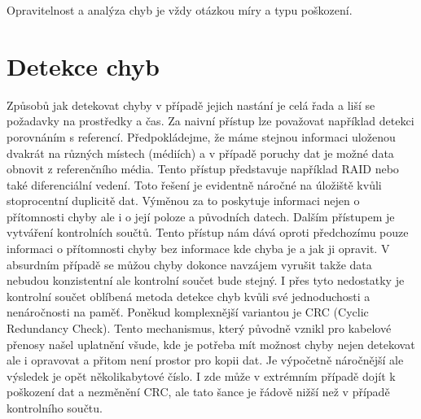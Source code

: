 Opravitelnost a analýza chyb je vždy otázkou míry a typu poškození.

\section{Detekce chyb}
\label{sec:errordetection}
Způsobů jak detekovat chyby v případě jejich nastání je celá řada a liší se požadavky na prostředky a čas. Za naivní přístup lze považovat například detekci porovnáním s referencí. Předpokládejme, že máme stejnou informaci uloženou dvakrát na různých místech (médiích) a v případě poruchy dat je možné data obnovit z referenčního média. Tento přístup představuje například RAID nebo také diferenciální vedení. Toto řešení je evidentně náročné na úložiště kvůli stoprocentní duplicitě dat. Výměnou za to poskytuje informaci nejen o přítomnosti chyby ale i o její poloze a původních datech. Dalším přístupem je vytváření kontrolních součtů. Tento přístup nám dává oproti předchozímu pouze informaci o přítomnosti chyby bez informace kde chyba je a jak ji opravit. V absurdním případě se můžou chyby dokonce navzájem vyrušit takže data nebudou konzistentní ale kontrolní součet bude stejný. I přes tyto nedostatky je kontrolní součet oblíbená metoda detekce chyb kvůli své jednoduchosti a nenáročnosti na paměť. Poněkud komplexnější variantou je CRC (Cyclic Redundancy Check). Tento mechanismus, který původně vznikl pro kabelové přenosy našel uplatnění všude, kde je potřeba mít možnost chyby nejen detekovat ale i opravovat a přitom není prostor pro kopii dat. Je výpočetně náročnější ale výsledek je opět několikabytové číslo. I zde může v extrémním případě dojít k poškození dat a nezměnění CRC, ale tato šance je řádově nižší než v případě kontrolního součtu.


